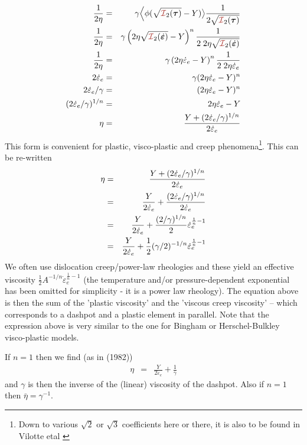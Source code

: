 \begin{eqnarray}
\frac{1}{2\eta} 
&=& \gamma \Big\langle \phi(\sqrt{{\III}_2(\bm \tau)}- Y)  \big\rangle 
\frac{1}{2 \sqrt{{\III}_2(\bm \tau)}} \nn\\
\frac{1}{2\eta} 
&=& \gamma \left(2\eta \sqrt{{\III}_2(\dot{\bm\varepsilon})}- Y\right)^n  \frac{1}{2 \; 2 \eta \sqrt{{\III}_2(\dot{\bm\varepsilon})}} \nn\\
\frac{1}{2\eta} 
&=& \gamma \left(2\eta \dot\varepsilon_e - Y\right)^n  \frac{1}{2 \; 2 \eta \dot\varepsilon_e } \nn\\
2 \dot\varepsilon_e
&=& \gamma (2\eta \dot\varepsilon_e - Y)^n  \nn\\
2 \dot\varepsilon_e / \gamma
&=&  (2\eta \dot\varepsilon_e - Y)^n  \nn\\
(2 \dot\varepsilon_e / \gamma)^{1/n}
&=&  2\eta \dot\varepsilon_e - Y \nn\\
\eta &=& \frac{ Y + (2 \dot\varepsilon_e / \gamma)^{1/n}}{2  \dot\varepsilon_e}
\end{eqnarray}
This form is convenient for plastic, visco-plastic and creep phenomena\footnote{Down 
to various $\sqrt{2}$ or $\sqrt{3}$ coefficients here or there, it 
is also to be found in Vilotte etal \cite{vidm82,vidm84,vimd86}}.
This can be re-written
\begin{eqnarray}
\eta 
&=& \frac{ Y + (2 \dot\varepsilon_e / \gamma)^{1/n}}{2  \dot\varepsilon_e} \nonumber\\
&=& \frac{ Y }{2  \dot\varepsilon_e}
+ \frac{ (2 \dot\varepsilon_e / \gamma)^{1/n}}{2  \dot\varepsilon_e} \nonumber\\
&=& \frac{ Y }{2  \dot\varepsilon_e}
+ \frac{ (2  / \gamma)^{1/n}}{2 }   \dot\varepsilon_e^{\frac1n-1} \nonumber\\
&=& \frac{ Y }{2  \dot\varepsilon_e}
+ \frac{1 }{2 } (\gamma/2)^{-1/n}  \dot\varepsilon_e^{\frac1n-1} 
\label{eq:zien75:a}
\end{eqnarray}
We often use dislocation creep/power-law rheologies and these yield an effective 
viscosity $\frac12 A^{-1/n} \dot\varepsilon_e^{\frac1n-1}$ (the temperature and/or 
pressure-dependent exponential has been omitted for simplicity - it is a power law rheology).
The equation above is then the sum of the 'plastic viscosity' and the 'viscous creep viscosity' 
-- which corresponds to a dashpot and a plastic element in parallel.
Note that the expression above is very similar to the one for Bingham or Herschel-Bulkley visco-plastic
models.

If $n=1$ then we find (as in \textcite{vidm82} (1982))
\begin{eqnarray}
\eta 
&=& \frac{ Y }{2  \dot\varepsilon_e}
+ \frac{1 }{\gamma } 
\end{eqnarray}
and $\gamma$ is then the inverse of the (linear) viscosity of the dashpot.
Also if $n=1$ then $\bar\eta=\gamma^{-1}$.

